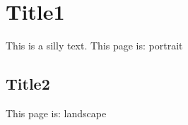 \documentclass[11pt]{article}
\author{Jürgen Keck}
\date{\today}
\title{}
\begin{document}
\section{Title1}
\label{sec:org28f9398}

This is a silly text.
This page is: portrait


\begin{landscape}
\section{Title2}
\label{sec:org5095433}

This page is: landscape
\end{landscape}
\end{document}
